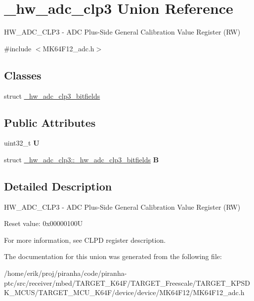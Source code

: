 \hypertarget{union__hw__adc__clp3}{}\section{\+\_\+hw\+\_\+adc\+\_\+clp3 Union Reference}
\label{union__hw__adc__clp3}


H\+W\+\_\+\+A\+D\+C\+\_\+\+C\+L\+P3 -\/ A\+DC Plus-\/\+Side General Calibration Value Register (RW)  




{\ttfamily \#include $<$M\+K64\+F12\+\_\+adc.\+h$>$}

\subsection*{Classes}
\begin{DoxyCompactItemize}
\item 
struct \hyperlink{struct__hw__adc__clp3_1_1__hw__adc__clp3__bitfields}{\+\_\+hw\+\_\+adc\+\_\+clp3\+\_\+bitfields}
\end{DoxyCompactItemize}
\subsection*{Public Attributes}
\begin{DoxyCompactItemize}
\item 
uint32\+\_\+t {\bfseries U}\hypertarget{union__hw__adc__clp3_a96130f5bf141bbaa3d0539e7df769903}{}\label{union__hw__adc__clp3_a96130f5bf141bbaa3d0539e7df769903}

\item 
struct \hyperlink{struct__hw__adc__clp3_1_1__hw__adc__clp3__bitfields}{\+\_\+hw\+\_\+adc\+\_\+clp3\+::\+\_\+hw\+\_\+adc\+\_\+clp3\+\_\+bitfields} {\bfseries B}\hypertarget{union__hw__adc__clp3_a098a2ea7d2d271c566ede9c5c5740c84}{}\label{union__hw__adc__clp3_a098a2ea7d2d271c566ede9c5c5740c84}

\end{DoxyCompactItemize}


\subsection{Detailed Description}
H\+W\+\_\+\+A\+D\+C\+\_\+\+C\+L\+P3 -\/ A\+DC Plus-\/\+Side General Calibration Value Register (RW) 

Reset value\+: 0x00000100U

For more information, see C\+L\+PD register description. 

The documentation for this union was generated from the following file\+:\begin{DoxyCompactItemize}
\item 
/home/erik/proj/piranha/code/piranha-\/ptc/src/receiver/mbed/\+T\+A\+R\+G\+E\+T\+\_\+\+K64\+F/\+T\+A\+R\+G\+E\+T\+\_\+\+Freescale/\+T\+A\+R\+G\+E\+T\+\_\+\+K\+P\+S\+D\+K\+\_\+\+M\+C\+U\+S/\+T\+A\+R\+G\+E\+T\+\_\+\+M\+C\+U\+\_\+\+K64\+F/device/device/\+M\+K64\+F12/M\+K64\+F12\+\_\+adc.\+h\end{DoxyCompactItemize}
